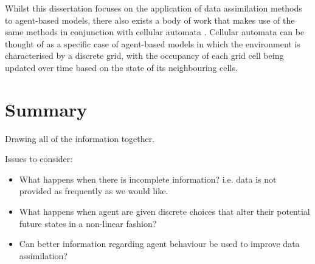 
Whilst this dissertation focuses on the application of data assimilation methods
to agent-based models, there also exists a body of work that makes use of the
same methods in conjunction with cellular automata \citep{li2012assimilating,
li2017exploring}.
Cellular automata can be thought of as a specific case of agent-based models in
which the environment is characterised by a discrete grid, with the occupancy of
each grid cell being updated over time based on the state of its neighbouring
cells.



\section{Summary}\label{sec:lit_rev:summary}

Drawing all of the information together.

Issues to consider:
\begin{itemize}
    \item What happens when there is incomplete information? i.e. data is not
        provided as frequently as we would like.
    \item What happens when agent are given discrete choices that alter their
        potential future states in a non-linear fashion?
    \item Can better information regarding agent behaviour be used to improve
        data assimilation?
\end{itemize}
